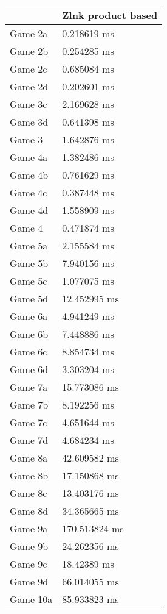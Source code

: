 \begin{multicols}{2}
\begin{tabular}{|l|l|}
	\hline
	& Zlnk product based \\ \hline
	Game 2a & 0.218619 ms \\ \hline
	Game 2b & 0.254285 ms \\ \hline
	Game 2c & 0.685084 ms \\ \hline
	Game 2d & 0.202601 ms \\ \hline
	Game 3c & 2.169628 ms \\ \hline
	Game 3d & 0.641398 ms \\ \hline
	Game 3 & 1.642876 ms \\ \hline
	Game 4a & 1.382486 ms \\ \hline
	Game 4b & 0.761629 ms \\ \hline
	Game 4c & 0.387448 ms \\ \hline
	Game 4d & 1.558909 ms \\ \hline
	Game 4 & 0.471874 ms \\ \hline
	Game 5a & 2.155584 ms \\ \hline
	Game 5b & 7.940156 ms \\ \hline
	Game 5c & 1.077075 ms \\ \hline
	Game 5d & 12.452995 ms \\ \hline
	Game 6a & 4.941249 ms \\ \hline
	Game 6b & 7.448886 ms \\ \hline
	Game 6c & 8.854734 ms \\ \hline
	Game 6d & 3.303204 ms \\ \hline
	Game 7a & 15.773086 ms \\ \hline
	Game 7b & 8.192256 ms \\ \hline
	Game 7c & 4.651644 ms \\ \hline
	Game 7d & 4.684234 ms \\ \hline
	Game 8a & 42.609582 ms \\ \hline
	Game 8b & 17.150868 ms \\ \hline
	Game 8c & 13.403176 ms \\ \hline
	Game 8d & 34.365665 ms \\ \hline
	Game 9a & 170.513824 ms \\ \hline
	Game 9b & 24.262356 ms \\ \hline
	Game 9c & 18.42389 ms \\ \hline
	Game 9d & 66.014055 ms \\ \hline
	Game 10a & 85.933823 ms \\ \hline

\end{tabular}
\end{multicols}
